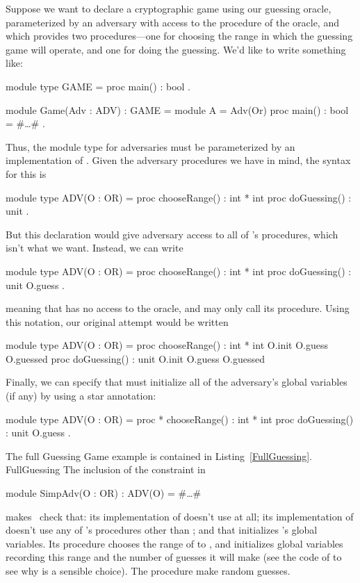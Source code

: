 Suppose we want to declare a cryptographic game using our guessing
oracle, parameterized by an adversary with access to the 
procedure of the oracle, and which provides two procedures---one
for choosing the range in which the guessing game will operate, and
one for doing the guessing.  We'd like to write something like:
\begin{easycrypt}{}{}
module type GAME = {
  proc main() : bool
}.

module Game(Adv : ADV) : GAME = {
  module A = Adv(Or)
  proc main() : bool = { #\ldots# }
}.
\end{easycrypt}
Thus, the module type  for adversaries must be parameterized
by an implementation of . Given the adversary procedures we have
in mind, the syntax for this is
\begin{easycrypt}{}{}
module type ADV(O : OR) = {
  proc chooseRange() : int * int
  proc doGuessing() : unit
}.
\end{easycrypt}
But this declaration would give adversary access to all of 's
procedures, which isn't what we want. Instead, we can write
\begin{easycrypt}{}{}
module type ADV(O : OR) = {
  proc chooseRange() : int * int {}
  proc doGuessing() : unit {O.guess}
}.
\end{easycrypt}
meaning that  has no access to the oracle, and
 may only call its  procedure. Using
this notation, our original attempt would be written
\begin{easycrypt}{}{}
module type ADV(O : OR) = {
  proc chooseRange() : int * int {O.init O.guess O.guessed}
  proc doGuessing() : unit {O.init O.guess O.guessed}
}
\end{easycrypt}
Finally, we can specify that  must initialize
all of the adversary's global variables (if any) by using a
star annotation:
\begin{easycrypt}{}{}
module type ADV(O : OR) = {
  proc * chooseRange() : int * int {}
  proc doGuessing() : unit {O.guess}
}.
\end{easycrypt}

The full Guessing Game example is contained in Listing~\ref{FullGuessing}.
 {}{FullGuessing}
The inclusion of the constraint  in
\begin{easycrypt}{}{}
module SimpAdv(O : OR) : ADV(O) = #\ldots#
\end{easycrypt}
makes \EasyCrypt\ check that: its implementation of 
doesn't use  at all; its implementation of 
doesn't use any of 's procedures other than ; and
that  initializes 's global variables.
Its  procedure chooses the range of  to ,
and initializes global variables recording this range and the
number of guesses it will make (see the code of  to see
why  is a sensible choice). The  procedure
make  random guesses.

